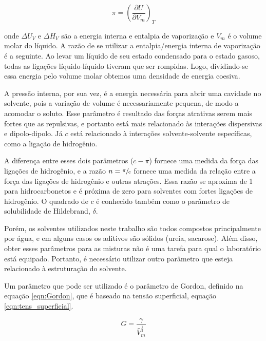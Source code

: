 		\begin{equation}
			\pi = \left( \dfrac{\partial U}{\partial V_m} \right)_T
			\label{eqn:pressao_interna}
		\end{equation}
		
		\noindent onde \(\Delta U_V\) e \(\Delta H_V\) são a energia interna e entalpia de vaporização e \(V_m\) é o volume molar do líquido. A razão de se utilizar a entalpia/energia interna de vaporização é a seguinte. Ao levar um líquido de seu estado condensado para o estado gasoso, todas as ligações líquido-líquido tiveram que ser rompidas. Logo, dividindo-se essa energia pelo volume molar obtemos uma densidade de energia coesiva.
		
		A pressão interna, por sua vez, é a energia necessária para abrir uma cavidade no solvente, pois a variação de volume é necessariamente pequena, de modo a acomodar o soluto. Esse parâmetro é resultado das forças atrativas serem mais fortes que as repulsivas, e portanto está mais relacionado às interações dispersivas e dipolo-dipolo. Já \(c\) está relacionado à interações solvente-solvente específicas, como a ligação de hidrogênio.
		
		A diferença entre esses dois parâmetros (\(c - \pi\)) fornece uma medida da força das ligações de hidrogênio, e a razão \(n = \sfrac{\pi}{c}\) fornece uma medida da relação entre a força das ligações de hidrogênio e outras atrações. Essa razão se aproxima de 1 para hidrocarbonetos e é próxima de zero para solventes com fortes ligações de hidrogênio. O quadrado de \(c\) é conhecido também como o parâmetro de solubilidade de Hildebrand, \(\delta\).
		
		Porém, os solventes utilizados neste trabalho são todos compostos principalmente por água, e em alguns casos os aditivos são sólidos (ureia, sacarose). Além disso, obter esses parâmetros para as misturas não é uma tarefa para qual o laboratório está equipado. Portanto, é necessário utilizar outro parâmetro que esteja relacionado à estruturação do solvente.
		
		Um parâmetro que pode ser utilizado é o parâmetro de Gordon, definido na equação \ref{eqn:Gordon}, que é baseado na tensão superficial, equação \ref{eqn:tens_superficial}. %

		\begin{equation}
			G = \dfrac{\gamma}{\bar{V}_m^{\frac{1}{3}}}
			\label{eqn:Gordon}
		\end{equation}
		
